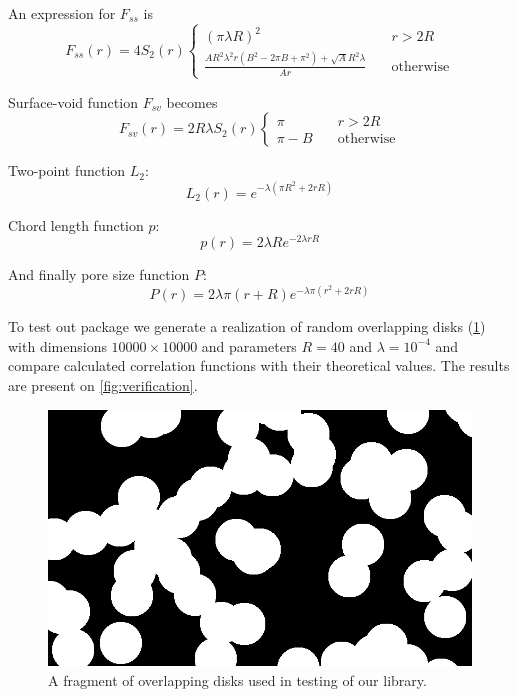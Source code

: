 \documentclass[reprint,amsmath,amssymb,aps,pre,showkeys,showpacs,nofootinbib]{revtex4-1}
\begin{document}
An expression for $F_{ss}$ is
\begin{equation*}
  F_{ss}(r) = 4S_2(r) \left\{
  \begin{array}{ll}
    (\pi\lambda R)^2 & \quad r > 2R \\
    \frac{AR^2\lambda^2 r(B^2 - 2\pi B + \pi^2) + \sqrt{A}R^2\lambda}{Ar} & \quad \text{otherwise}
  \end{array}
  \right.
\end{equation*}

Surface-void function $F_{sv}$ becomes
\begin{equation*}
  F_{sv}(r) = 2R\lambda S_2(r) \left\{
  \begin{array}{ll}
    \pi & \quad r > 2R \\
    \pi-B & \quad \text{otherwise}
  \end{array}
  \right.
\end{equation*}

Two-point function $L_2$:
\begin{equation*}
  L_2(r) = e^{-\lambda(\pi R^2 + 2rR)}
\end{equation*}

Chord length function $p$:
\begin{equation*}
  p(r) = 2\lambda R e^{-2\lambda rR}
\end{equation*}

And finally pore size function $P$:
\begin{equation*}
  P(r) = 2\lambda\pi (r+R) e^{-\lambda\pi(r^2 + 2rR)}
\end{equation*}

To test out package we generate a realization of random overlapping disks
(\cref{fig:overlapping-disks}) with dimensions $10000 \times 10000$ and
parameters $R = 40$ and $\lambda = 10^{-4}$ and compare calculated correlation
functions with their theoretical values. The results are present on
\cref{fig:verification}.
\begin{figure}[ht]
  \centering
  \includegraphics[width=0.9\linewidth]{images/disks-fragment.png}
  \caption[]{A fragment of overlapping disks used in testing of our library.}
  \label{fig:overlapping-disks}
\end{figure}
\end{document}

